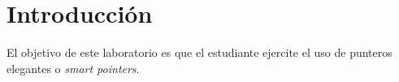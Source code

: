 \section{Introducción}

El objetivo de este laboratorio es que el estudiante ejercite el 
uso de punteros elegantes o \emph{smart pointers}.
